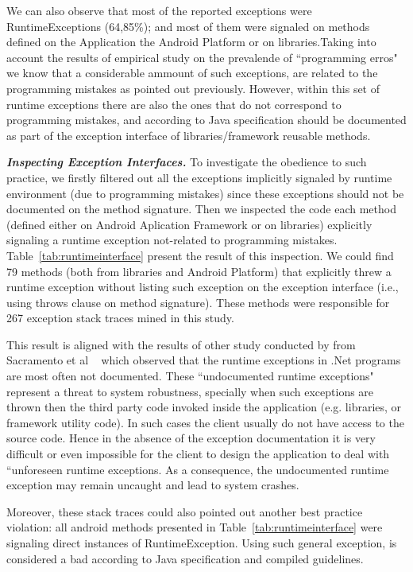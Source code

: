 \documentclass[conference]{IEEEtran}
\begin{document}
We can also observe that most of the reported exceptions were RuntimeExceptions
(64,85\%); and most of them were signaled on methods defined on the Application 
the Android Platform or on libraries.Taking into account the results of empirical study on 
the prevalende of ``programming erros" we know that a considerable ammount 
of such exceptions, are related to the programming mistakes
as pointed out previously. However, within this set of runtime exceptions there are also the ones that do not correspond to programming mistakes,
and according to Java specification should be documented as part of the exception interface of libraries/framework reusable
methods.

\emph{\textbf{Inspecting Exception Interfaces.}} To investigate the obedience to such practice, we firstly filtered out all the exceptions implicitly
 signaled by  runtime environment (due to programming mistakes) since these exceptions 
should not be documented on the method signature.  Then we inspected the code each method 
(defined either on Android  Aplication Framework or on libraries) 
explicitly signaling a runtime exception not-related to programming mistakes.
Table~\ref{tab:runtimeinterface} present the result of this inspection. 
We could find 79 methods (both from libraries and Android Platform) that  explicitly threw a runtime exception 
without listing such exception on the exception interface (i.e., using 
throws clause on method signature). These methods were responsible for 
267 exception stack traces mined in this study.

This result is aligned with the results of other study conducted by from 
Sacramento et al ~\cite{sacramento2006unchecked} which observed that the
runtime exceptions in .Net programs are most often not documented.
These ``undocumented runtime exceptions" represent a threat to system robustness, specially
when such exceptions are thrown then the third party code invoked inside the application 
(e.g. libraries, or framework utility code). In such cases the client usually do not have access to 
the source code. Hence in the absence of the exception documentation it is very difficult or even impossible
 for the client to design the application to deal with ``unforeseen runtime exceptions. As a consequence, the
 undocumented runtime exception may remain uncaught and lead to system crashes.

Moreover, these stack traces could also pointed out another best practice violation: all android methods
 presented in Table~\ref{tab:runtimeinterface} were signaling direct instances of RuntimeException. 
Using such general exception, is considered a bad according to Java specification and compiled guidelines.
\end{document}
